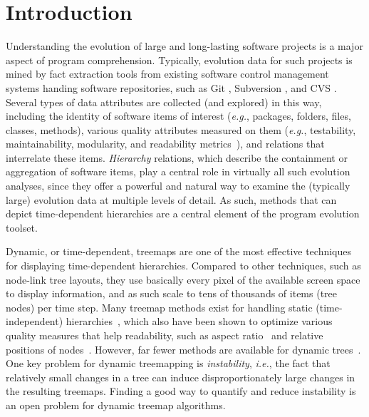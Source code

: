 \section{Introduction} \label{sec:intro}
%
%
Understanding the evolution of large and long-lasting software projects is a major aspect of program comprehension. Typically, evolution data for such projects is mined by fact extraction tools from existing software control management systems handing software repositories, such as Git \citep{git}, Subversion \citep{subversion}, and CVS \citep{cvs}.
Several types of data attributes are collected (and explored) in this way, including the identity of software items of interest (\emph{e.g.}, packages, folders, files, classes, methods), various quality attributes measured on them (\emph{e.g.}, testability, maintainability, modularity, and readability metrics~\citep{lanza06}), and relations that interrelate these items. \emph{Hierarchy} relations, which describe the containment or aggregation of software items, play a central role in virtually all such evolution analyses, since they offer a powerful and natural way to examine the (typically large) evolution data at multiple levels of detail. As such, methods that can depict time-dependent hierarchies are a central element of the program evolution toolset.

Dynamic, or time-dependent, treemaps are one of the most effective techniques for displaying time-dependent hierarchies. Compared to other techniques, such as node-link tree layouts, they use basically every pixel of the available screen space to display information, and as such scale to tens of thousands of items (tree nodes) per time step. Many treemap methods exist for handling static (time-independent) hierarchies~\citep{shneiderman92,sqr}, which also have been shown to optimize various quality measures that help readability, such as aspect ratio~\citep{sqr, nagamochi07} and relative positions of nodes~\citep{sot,ordered,Ghoniem2015, Buchin2011,nmap}. However, far fewer methods are available for dynamic trees~\citep{hahn10,sondag17,htm}. One key problem for dynamic treemapping is \emph{instability}, \emph{i.e.}, the fact that relatively small changes in a tree can induce disproportionately large changes in the resulting treemaps. Finding a good way to quantify and reduce instability is an open problem for dynamic treemap algorithms.

